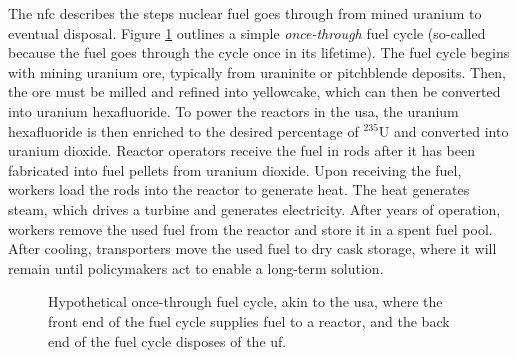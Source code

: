 The \gls{nfc} describes the steps nuclear fuel goes through
from mined uranium to eventual disposal. Figure \ref{fig:once-through} outlines a simple \textit{once-through} fuel cycle (so-called because the fuel goes through the cycle once in its lifetime). The fuel cycle begins with mining uranium ore, typically from uraninite or pitchblende deposits. Then, the ore must be milled and refined into yellowcake, which can then be converted into uranium hexafluoride. To power the reactors in the \gls{usa}, the uranium hexafluoride is then enriched to the desired percentage of $^{235}$U and converted into uranium dioxide. Reactor operators receive the fuel in rods after it has been fabricated into fuel pellets from uranium dioxide. Upon receiving the fuel, workers load the rods into the reactor to generate heat. The heat generates steam, which drives a turbine and generates electricity. After years of operation, workers remove the used fuel from the reactor and store it in a spent fuel pool. After cooling, transporters move the used fuel to dry cask storage, where it will remain until policymakers act to enable a long-term solution.

\begin{figure}[H]
    \centering
    \caption{Hypothetical once-through fuel cycle, akin to the \gls{usa}, where the front end of the fuel cycle supplies fuel to a reactor, and the back end of the fuel cycle disposes of the \gls{uf}.}
    \label{fig:once-through}
\end{figure}

